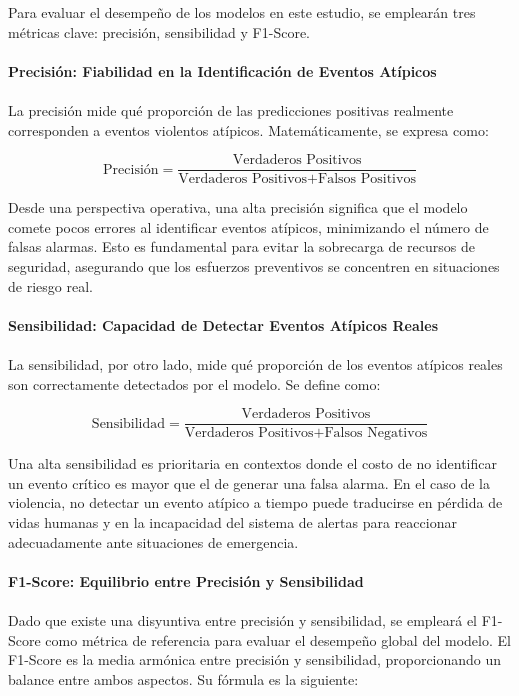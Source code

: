 Para evaluar el desempeño de los modelos en este estudio, se emplearán tres métricas clave: precisión, sensibilidad y F1-Score.
\\\\
\textbf{Precisión: Fiabilidad en la Identificación de Eventos Atípicos}
\\\\
La precisión mide qué proporción de las predicciones positivas realmente corresponden a eventos violentos atípicos. Matemáticamente, se expresa como:

\begin{equation}
\text{Precisión} = \frac{\text{Verdaderos Positivos}}{\text{Verdaderos Positivos} + \text{Falsos Positivos}}
\end{equation}

Desde una perspectiva operativa, una alta precisión significa que el modelo comete pocos errores al identificar eventos atípicos, minimizando el número de falsas alarmas. Esto es fundamental para evitar la sobrecarga de recursos de seguridad, asegurando que los esfuerzos preventivos se concentren en situaciones de riesgo real.
\\\\
\textbf{Sensibilidad: Capacidad de Detectar Eventos Atípicos Reales}
\\\\
La sensibilidad, por otro lado, mide qué proporción de los eventos atípicos reales son correctamente detectados por el modelo. Se define como:

\begin{equation}
\text{Sensibilidad} = \frac{\text{Verdaderos Positivos}}{\text{Verdaderos Positivos} + \text{Falsos Negativos}}
\end{equation}

Una alta sensibilidad es prioritaria en contextos donde el costo de no identificar un evento crítico es mayor que el de generar una falsa alarma. En el caso de la violencia, no detectar un evento atípico a tiempo puede traducirse en pérdida de vidas humanas y en la incapacidad del sistema de alertas para reaccionar adecuadamente ante situaciones de emergencia.
\\\\
\textbf{F1-Score: Equilibrio entre Precisión y Sensibilidad}
\\\\
Dado que existe una disyuntiva entre precisión y sensibilidad, se empleará el F1-Score como métrica de referencia para evaluar el desempeño global del modelo. El F1-Score es la media armónica entre precisión y sensibilidad, proporcionando un balance entre ambos aspectos. Su fórmula es la siguiente:

